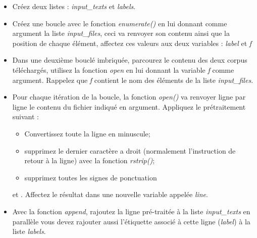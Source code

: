 \begin{itemize}
	\item Créez deux listes : \textit{input\_texts} et \textit{labels}.
	\item Créez une boucle avec le fonction \textit{enumerate()} en lui donnant comme argument la liste \textit{input\_files}, ceci va renvoyer son contenu ainsi que la position de chaque élément, affectez ces valeurs aux deux variables : \textit{label} et \textit{f}
	\item Dans une deuxième bouclé imbriquée, parcourez le contenu des deux corpus téléchargés, utilisez la fonction \textit{open} en lui donnant la variable \textit{f} comme argument. Rappelez que \textit{f} contient le nom des éléments de la liste \textit{input\_files}.
	\item Pour chaque itération de la boucle, la fonction \textit{open()} va renvoyer ligne par ligne le contenu du fichier indiqué en argument. Appliquez le prétraitement suivant :
	\begin{itemize}
		\item Convertissez toute la ligne en minuscule;
		\item supprimez le dernier caractère a droit (normalement l'instruction de retour à la ligne) avec la fonction \textit{rstrip()};
		\item supprimez toutes les signes de ponctuation
	\end{itemize}
	 et . Affectez le résultat dans une nouvelle variable appelée \textit{line}.
	\item Avec la fonction \textit{append}, rajoutez la ligne pré-traitée à la liste \textit{input\_texts} en parallèle vous devez rajouter aussi l'étiquette associé à cette ligne (\textit{label}) à la liste \textit{labels}.
\end{itemize}




